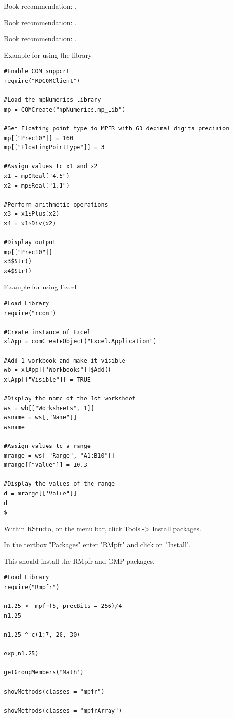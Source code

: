 \vpara
Book recommendation: \cite{Adler2012}.

Book recommendation: \cite{Verzani2011}.

Book recommendation: \cite{Chang2012}.

\vpara
Example for using the library

\begin{lstlisting}
#Enable COM support
require("RDCOMClient")

#Load the mpNumerics library
mp = COMCreate("mpNumerics.mp_Lib")

#Set Floating point type to MPFR with 60 decimal digits precision
mp[["Prec10"]] = 160
mp[["FloatingPointType"]] = 3

#Assign values to x1 and x2
x1 = mp$Real("4.5")
x2 = mp$Real("1.1")

#Perform arithmetic operations
x3 = x1$Plus(x2)
x4 = x1$Div(x2)

#Display output
mp[["Prec10"]]
x3$Str()
x4$Str()
\end{lstlisting}

\vpara
Example for using Excel

\begin{lstlisting}
#Load Library
require("rcom")

#Create instance of Excel
xlApp = comCreateObject("Excel.Application")

#Add 1 workbook and make it visible
wb = xlApp[["Workbooks"]]$Add()
xlApp[["Visible"]] = TRUE

#Display the name of the 1st worksheet
ws = wb[["Worksheets", 1]]
wsname = ws[["Name"]]
wsname

#Assign values to a range
mrange = ws[["Range", "A1:B10"]]
mrange[["Value"]] = 10.3

#Display the values of the range
d = mrange[["Value"]]
d
$
\end{lstlisting}

Within RStudio, on the menu bar, click Tools -> Install packages.

In the textbox "Packages" enter "RMpfr" and click on "Install".

This should install the RMpfr and GMP packages.

\begin{lstlisting}
#Load Library
require("Rmpfr")

n1.25 <- mpfr(5, precBits = 256)/4
n1.25

n1.25 ^ c(1:7, 20, 30)

exp(n1.25)

getGroupMembers("Math")

showMethods(classes = "mpfr")

showMethods(classes = "mpfrArray")

\end{lstlisting}





